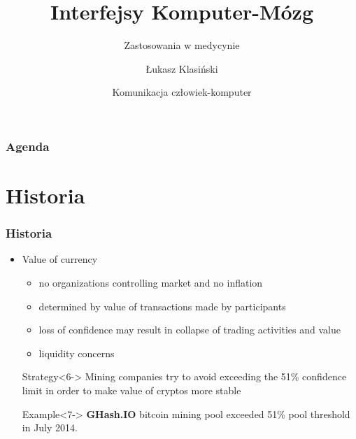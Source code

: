 \documentclass{beamer}
\title[	Interfejsy Komputer-Mózg]
{Interfejsy Komputer-Mózg}
\subtitle{Zastosowania w medycynie }
\author[Łukasz Klasiński] 
{ Łukasz Klasiński}
\institute[UWr]
{
  Wydział informatyki\\
  Uniwersytet Wrocławski
}
\date[18-12-2018]
{ Komunikacja człowiek-komputer }
\begin{document}
 
\frame{\titlepage}
\begin{frame}
    \frametitle{Agenda}
      \tableofcontents
\end{frame}


\section{Historia}
\begin{frame}
\frametitle{Historia}
\begin{itemize}
    \item<1-> Value of currency
    \begin{itemize}
        \item<2-> no organizations controlling market and no inflation 
        \item<3-> determined by value of transactions made by participants
        \item<4-> loss of confidence may result in collapse of trading activities and value
        \item<5-> liquidity concerns
    \end{itemize}
    \vspace{20pt}
    \begin{block}{Strategy}<6->
         Mining companies try to avoid exceeding the 51\% confidence limit in order
         to make value of cryptos more stable  
    \end{block}    
    \begin{exampleblock}{Example}<7->
        \textbf{GHash.IO} bitcoin mining pool exceeded 51\% pool threshold in July 2014.  
    \end{exampleblock}
\end{itemize}
\end{frame}
\end{document}
